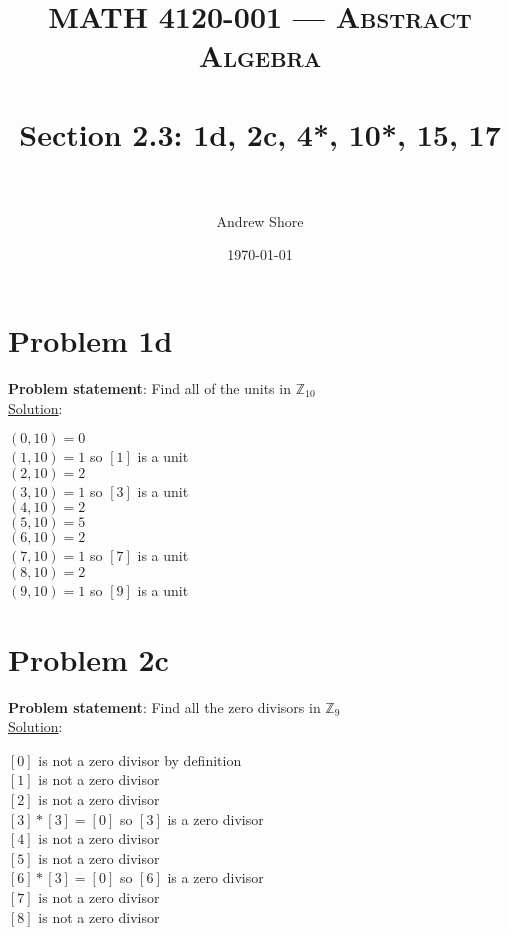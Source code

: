 \documentclass{article} %
\title{ 
\normalfont \normalsize 
\textsc{MATH 4120-001 --- Abstract Algebra} \\
\horrule{0.5pt} \\[0cm] %
\huge Section 2.3: 1d, 2c, 4*, 10*, 15, 17 \\ %
\horrule{2pt} \\[0cm] %
}
\author{Andrew Shore} %
\date{\normalsize\today} %
\begin{document}
\maketitle %

\section*{Problem 1d}


\textbf{Problem statement}: Find all of the units in $\mathbb{Z}_{10}$
\\

\underline{Solution}: 
\begin{addmargin}[1em]{0em}
$(0, 10) = 0 $\\
$(1, 10) = 1 $ so $[1]$ is a unit\\
$(2, 10) = 2 $\\
$(3, 10) = 1 $ so $[3]$ is a unit\\
$(4, 10) = 2 $\\
$(5, 10) = 5 $\\
$(6, 10) = 2 $\\
$(7, 10) = 1 $ so $[7]$ is a unit\\
$(8, 10) = 2 $\\
$(9, 10) = 1 $ so $[9]$ is a unit\\
\end{addmargin}    

\newpage

\section*{Problem 2c}

\textbf{Problem statement}: Find all the zero divisors in $\mathbb{Z}_{9}$
\\

\underline{Solution}: 
\begin{addmargin}[1em]{0em}
$[0]$ is not a zero divisor by definition\\
$[1]$ is not a zero divisor \\
$[2]$ is not a zero divisor \\
$[3] * [3] = [0]$ so $[3]$ is a zero divisor \\
$[4]$ is not a zero divisor \\
$[5]$ is not a zero divisor \\
$[6] * [3] = [0]$ so $[6]$ is a zero divisor \\
$[7]$ is not a zero divisor \\
$[8]$ is not a zero divisor
\end{addmargin}
\end{document}
